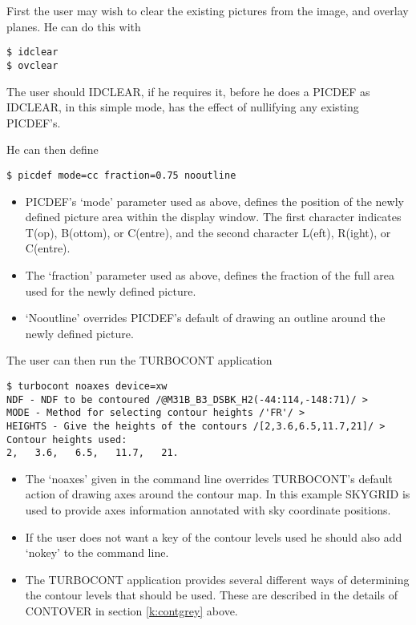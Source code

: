 First the user may wish to clear the existing pictures from the image, and
overlay planes. He can do this with
\begin{small}
\begin{verbatim}
$ idclear 
$ ovclear
\end{verbatim}
\end{small}
The user should IDCLEAR, if he requires it, before he does a PICDEF as IDCLEAR,
in this simple mode, has the effect of nullifying any existing PICDEF's. 

He can then define 
\begin{small}
\begin{verbatim}
$ picdef mode=cc fraction=0.75 nooutline
\end{verbatim}
\end{small}
\begin{itemize}
\item PICDEF's `mode' parameter used as above, defines the position of the newly
defined picture area within the display window. The first character indicates
T(op), B(ottom), or C(entre), and the second character L(eft), R(ight), or
C(entre).
\item The `fraction' parameter used as above, defines the fraction of the full
area used for the newly defined picture.
\item `Nooutline' overrides PICDEF's default of drawing an outline around the
newly defined picture.
\end{itemize}

The user can then run the TURBOCONT application 

\begin{small}
\begin{verbatim}
$ turbocont noaxes device=xw
NDF - NDF to be contoured /@M31B_B3_DSBK_H2(-44:114,-148:71)/ > 
MODE - Method for selecting contour heights /'FR'/ > 
HEIGHTS - Give the heights of the contours /[2,3.6,6.5,11.7,21]/ > 
Contour heights used:
2,   3.6,   6.5,   11.7,   21.
\end{verbatim}
\end{small}
\begin{itemize}
\item The `noaxes' given in the command line overrides TURBOCONT's default
action of drawing axes around the contour map. In this example SKYGRID is used
to provide axes information annotated with sky coordinate positions.
\item If the user does not want a key of the contour levels used he should also
add `nokey' to the command line.
\item The TURBOCONT application provides several different ways of determining
the contour levels that should be used. These are described in the details of
CONTOVER in section \ref{k:contgrey} above.
\end{itemize}

